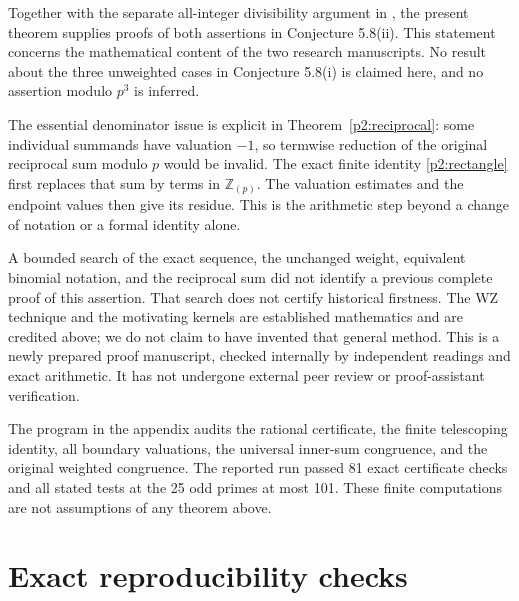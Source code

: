 \documentclass[11pt,a4paper]{article}
\theoremstyle{remark}\newtheorem{remark}[theorem]{Remark}
\newcommand{\Z}{\mathbb Z}\newcommand{\Q}{\mathbb Q}
\begin{document}
Together with the separate all-integer divisibility argument in
\cite{Previous}, the present theorem supplies proofs of both
assertions in Conjecture 5.8(ii). This statement concerns the
mathematical content of the two research manuscripts. No result
about the three unweighted cases in Conjecture 5.8(i) is claimed
here, and no assertion modulo \(p^3\) is inferred.

The essential denominator issue is explicit in
Theorem~\ref{p2:reciprocal}: some individual summands have valuation
\(-1\), so termwise reduction of the original reciprocal sum modulo
\(p\) would be invalid. The exact finite identity
\eqref{p2:rectangle} first replaces that sum by terms in
\(\Z_{(p)}\). The valuation estimates and the endpoint values then
give its residue. This is the arithmetic step beyond a change of
notation or a formal identity alone.

A bounded search of the exact sequence, the unchanged weight,
equivalent binomial notation, and the reciprocal sum did not identify
a previous complete proof of this assertion. That search does not
certify historical firstness. The WZ technique and the motivating
kernels are established mathematics and are credited above; we do
not claim to have invented that general method. This is a newly
prepared proof manuscript, checked internally by independent
readings and exact arithmetic. It has not undergone external peer
review or proof-assistant verification.

The program in the appendix audits the rational certificate, the
finite telescoping identity, all boundary valuations, the universal
inner-sum congruence, and the original weighted congruence. The
reported run passed 81 exact certificate checks and all stated
tests at the 25 odd primes at most 101. These finite computations
are not assumptions of any theorem above.

\appendix
\section{Exact reproducibility checks}
\end{document}
